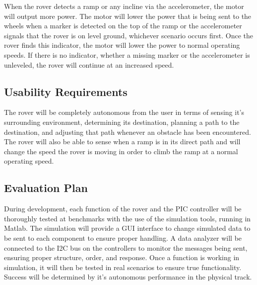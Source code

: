 When the rover detects a ramp or any incline via the accelerometer, the motor will output more power. The motor will lower the power that is being sent to the wheels when a marker is detected on the top of the ramp or the accelerometer signals that the rover is on level ground, whichever scenario occurs first. Once the rover finds this indicator, the motor will lower the power to normal operating speeds. If there is no indicator, whether a missing marker or the accelerometer is unleveled, the rover will continue at an increased speed.

\subsection*{Usability Requirements}
The rover will be completely autonomous from the user in terms of sensing it’s surrounding environment, determining its destination, planning a path to the destination, and adjusting that path whenever an obstacle has been encountered. The rover will also be able to sense when a ramp is in its direct path and will change the speed the rover is moving in order to climb the ramp at a normal operating speed. 

\subsection*{Evaluation Plan}
During development, each function of the rover and the PIC controller will be thoroughly tested at benchmarks with the use of the simulation tools, running in Matlab. The simulation will provide a GUI interface to change simulated data to be sent to each component to ensure proper handling. A data analyzer will be connected to the I2C bus on the controllers to monitor the messages being sent, ensuring proper structure, order, and response. Once a function is working in simulation, it will then be tested in real scenarios to ensure true functionality. Success will be determined by it's autonomous performance in the physical track.



